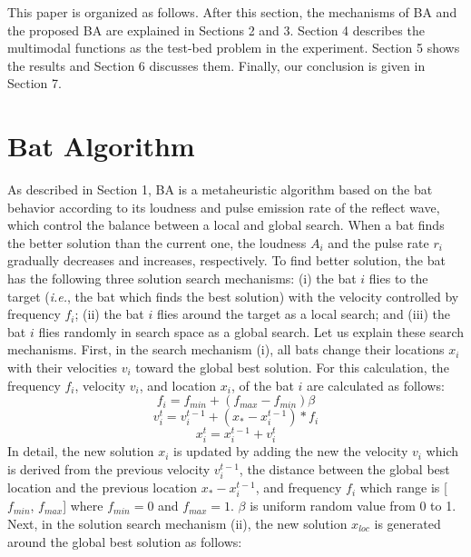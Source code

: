 \documentclass{ies2018}
\begin{document}
This paper is organized as follows. After this section, the mechanisms of BA and the proposed BA are explained in Sections 2 and 3. Section 4 describes the multimodal functions as the test-bed problem in the experiment. Section 5 shows the results and Section 6 discusses them. Finally, our conclusion is given in Section 7.

\section{Bat Algorithm}
As described in Section 1, BA is a metaheuristic algorithm based on the bat behavior according to its loudness and pulse emission rate of the reflect wave, which control the balance between a local and global search. When a bat finds the better solution than the current one, the loudness $A_i$ and the pulse rate $r_i$ gradually decreases and increases, respectively. To find better solution, the bat has the following three solution search mechanisms: (i) the bat $i$ flies to the target (\textit{i.e.}, the bat which finds the best solution) with the velocity controlled by frequency $f_i$; (ii) the bat $i$ flies around the target as a local search; and (iii) the bat $i$ flies randomly in search space as a global search.
Let us explain these search mechanisms.
First, in the search mechanism (i), all bats change their locations $x_i$ with their velocities $v_i$ toward the global best solution. For this calculation, the frequency $f_i$, velocity $v_i$, and location $x_i$, of the bat $i$ are calculated as follows:
\begin{equation}
f_{i} =f_{min}+(f_{max}-f_{min}) \beta
\label{eq:freq} 
\end{equation}
\begin{equation}
v_i^t=v_i^{t-1}+(x_*-x_i^{t-1})* f_i
\label{eq:vi}
\end{equation}
\begin{equation}
x_i^t=x_i^{t-1}+v_i^t
\label{eq:xi}
\end{equation}
In detail, the new solution $x_i$ is updated by adding the new the velocity ${v_i}$ which is derived from the previous velocity $v_i^{t-1}$, the distance between the global best location and the previous location $x_*-x_i^{t-1}$, and frequency $f_i$ which range is [${f_{min}}$, ${f_{max}}$] where ${f_{min}}=0$ and ${f_{max}}=1$. $\beta $ is uniform random value from 0 to 1. Next, in the solution search mechanism (ii), the new solution $x_{loc}$ is generated around the global best solution as follows:
\end{document}
